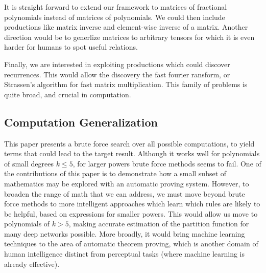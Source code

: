 It is straight forward to extend our framework to matrices of fractional
polynomials instead of matrices of polynomials.  We could
then include productions like matrix inverse and element-wise inverse of
a matrix.  Another direction would be to generlize matrices to arbitrary tensors
for which it is even harder for humans to spot useful relations.

Finally, we are interested in exploiting productions which could discover 
recurrences. This would allow the discovery the fast fourier ransform, or
Strassen's algorithm for fast matrix multiplication. This family of problems is quite broad,
and crucial in computation.


\subsection{Computation Generalization}\label{agenda}

This paper presents a brute force search over all possible computations, 
to yield terms that could lead to the target result. Although it works
well for polynomials of small degrees $k \leq 5$, for larger powers 
brute force methods seems to fail. One of the contributions of this paper is to
demonstrate how a small subset of mathematics may be explored with an automatic proving
system. However, to broaden the range of math that we can address, we
must move beyond brute force methods to more intelligent approaches
which learn which rules are likely to be helpful, based on expressions
for smaller powers. This would allow us move to polynomials of $k>5$,
making accurate estimation of the partition function for many deep
networks possible. More broadly, it would bring machine learning techniques
to the area of automatic theorem proving, which is another domain of
human intelligence distinct from perceptual tasks (where machine
learning is already effective). 




